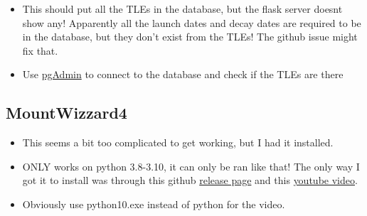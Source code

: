 \documentclass[../main.tex]{subfiles}
\begin{document}
\begin{itemize}
\begin{enumerate}
        \item In one terminal instance (I was using powershell) run \verb|$env:PYTHONPATH = "C:\...Yourpath...\satchecker\src"|
        \item Then run \verb|flask run| 
    \end{enumerate}
    \item This should put all the TLEs in the database, but the flask server doesnt show any! Apparently all the launch dates and decay dates are required to be in the database, but they don't exist from the TLEs! The github issue might fix that.
    \item Use \href{https://www.pgadmin.org/}{pgAdmin} to connect to the database and check if the TLEs are there
\end{itemize}
\subsection{MountWizzard4}
\begin{itemize}
    \item This seems a bit too complicated to get working, but I had it installed.
    \item ONLY works on python 3.8-3.10, it can only be ran like that! The only way I got it to install was through this github \href{https://github.com/mworion/InstallerMW4/releases}{release page} and this \href{https://www.youtube.com/watch?v=Tzob8ZSnMH0}{youtube video}.
    \item Obviously use python10.exe instead of python for the video.
\end{itemize}
\end{document}
